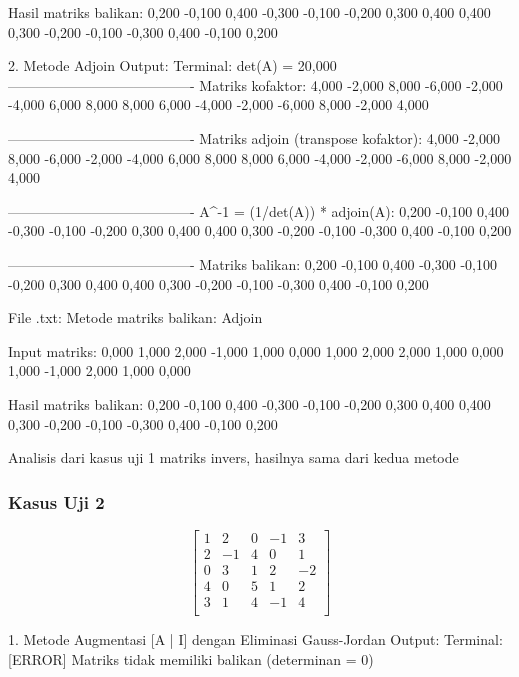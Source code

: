 \documentclass[12pt]{article}
\begin{document}
\begin{enumerate}
\begin{keluaran}
Hasil matriks balikan:
0,200	-0,100	0,400	-0,300
-0,100	-0,200	0,300	0,400
0,400	0,300	-0,200	-0,100
-0,300	0,400	-0,100	0,200

2. Metode Adjoin
Output:
Terminal:
det(A) = 20,000
----------------------------------------
Matriks kofaktor:
4,000   -2,000  8,000   -6,000
-2,000  -4,000  6,000   8,000
8,000   6,000   -4,000  -2,000
-6,000  8,000   -2,000  4,000

----------------------------------------
Matriks adjoin (transpose kofaktor):
4,000   -2,000  8,000   -6,000
-2,000  -4,000  6,000   8,000
8,000   6,000   -4,000  -2,000
-6,000  8,000   -2,000  4,000

----------------------------------------
A^-1 = (1/det(A)) * adjoin(A):
0,200   -0,100  0,400   -0,300
-0,100  -0,200  0,300   0,400
0,400   0,300   -0,200  -0,100
-0,300  0,400   -0,100  0,200

----------------------------------------
Matriks balikan:
0,200   -0,100  0,400   -0,300
-0,100  -0,200  0,300   0,400
0,400   0,300   -0,200  -0,100
-0,300  0,400   -0,100  0,200

File .txt:
Metode matriks balikan: Adjoin

Input matriks:
0,000	1,000	2,000	-1,000
1,000	0,000	1,000	2,000
2,000	1,000	0,000	1,000
-1,000	2,000	1,000	0,000

Hasil matriks balikan:
0,200	-0,100	0,400	-0,300
-0,100	-0,200	0,300	0,400
0,400	0,300	-0,200	-0,100
-0,300	0,400	-0,100	0,200
\end{keluaran}
Analisis dari kasus uji 1 matriks invers, hasilnya sama dari kedua metode
\subsubsection{Kasus Uji 2}
\begin{equation}
    \begin{bmatrix}
        1 & 2 & 0 & -1 & 3 \\
        2 & -1 & 4 & 0 & 1 \\
        0 & 3 & 1 & 2 & -2 \\
        4 & 0 & 5 & 1 & 2 \\
        3 & 1 & 4 & -1 & 4 \\
    \end{bmatrix}
\end{equation}
\begin{keluaran}
1. Metode Augmentasi [A | I] dengan Eliminasi Gauss-Jordan
Output:
Terminal:
[ERROR] Matriks tidak memiliki balikan (determinan = 0)


\end{keluaran}
\end{enumerate}
\end{document}
